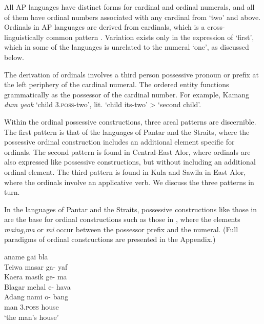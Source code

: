All AP languages have distinct forms for cardinal and ordinal numerals, and all of them have ordinal numbers associated with any cardinal from `two' and above. Ordinals in AP languages are derived from cardinals, which is a cross-linguistically common pattern \citep{StolzEtAl2013}. Variation exists only in the expression of `first', which in some of the languages is unrelated to the numeral `one', as discussed below. 

The derivation of ordinals involves a third person possessive pronoun or prefix at the left periphery of the cardinal numeral. The ordered entity functions grammatically as the possessor of the cardinal number. For example, Kamang \textit{dum yeok} `child 3.\textsc{poss}{}-two', lit. `child its-two' {\textgreater} `second child'. 

Within the ordinal possessive constructions, three areal patterns are discernible. The first pattern is that of the languages of Pantar and the Straits, where the possessive ordinal construction includes an additional element specific for ordinals. The second pattern is found in Central-East Alor, where ordinals are also expressed like possessive constructions, but without including an additional ordinal element. The third pattern is found in Kula and Sawila in East Alor, where the ordinals involve an applicative verb. We discuss the three patterns in turn.

In the languages of Pantar and the Straits, possessive constructions like those in  are the base for ordinal constructions such as those in , where the elements \textit{maing},\textit{ma} or \textit{mi} occur between the possessor prefix and the numeral. (Full paradigms of ordinal constructions are presented in the Appendix.) 

\ea\label{bkm:Ref342649616}
    aname    gai    bla\\
  Teiwa      masar    ga-    yaf\\
  Kaera      masik    ge-    ma\\
  Blagar      mehal    {\textglotstop}e-    hava\\
  Adang       nami    o-    bang\\
   { }        man   \textsc{3.poss}  house  \\
\glt `the man's house'  \\ 
\z

